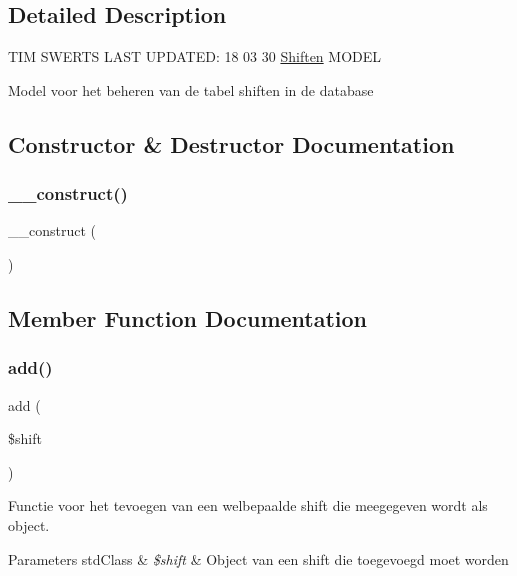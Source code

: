 \subsection{Detailed Description}
T\+IM S\+W\+E\+R\+TS L\+A\+ST U\+P\+D\+A\+T\+ED\+: 18 03 30 \mbox{\hyperlink{class_shiften}{Shiften}} M\+O\+D\+EL

Model voor het beheren van de tabel shiften in de database 

\subsection{Constructor \& Destructor Documentation}
\mbox{\label{class_shiften___model_a095c5d389db211932136b53f25f39685}} 
\subsubsection{\texorpdfstring{\+\_\+\+\_\+construct()}{\_\_construct()}}
{\footnotesize\ttfamily \+\_\+\+\_\+construct (\begin{DoxyParamCaption}{ }\end{DoxyParamCaption})}



\subsection{Member Function Documentation}
\mbox{\label{class_shiften___model_a3fc76f85c3f3f387825bd98a099eb973}} 
\subsubsection{\texorpdfstring{add()}{add()}}
{\footnotesize\ttfamily add (\begin{DoxyParamCaption}\item[{}]{\$shift }\end{DoxyParamCaption})}



Functie voor het tevoegen van een welbepaalde shift die meegegeven wordt als object. 


\begin{DoxyParams}[1]{Parameters}
std\+Class & {\em \$shift} & Object van een shift die toegevoegd moet worden \\
\hline
\end{DoxyParams}
\mbox{\label{class_shiften___model_a2f8258add505482d7f00ea26493a5723}} 
